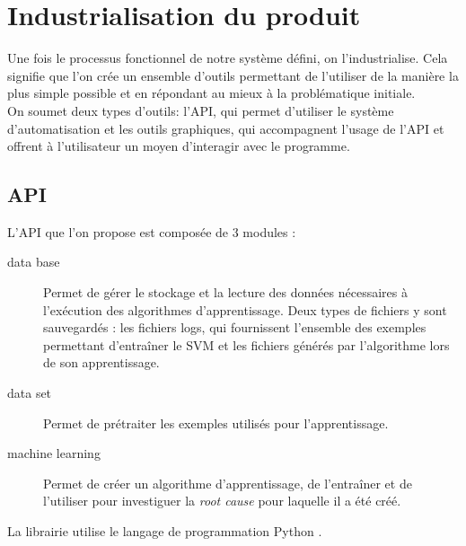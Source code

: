 \chapter{Industrialisation du produit}
\label{Industrialisation du produit}
\thispagestyle{fancy}
Une fois le processus fonctionnel de notre système défini, on l'industrialise. Cela signifie que l'on crée un ensemble d'outils permettant de l'utiliser de la manière la plus simple possible et en répondant au mieux à la problématique initiale. \\
On soumet deux types d'outils: l'API, qui permet d'utiliser le système d'automatisation et les outils graphiques, qui accompagnent l'usage de l'API et offrent à l'utilisateur un moyen d'interagir avec le programme.  

\section{API}
\label{Industrialisation du produit: API}
L'API que l'on propose est composée de 3 modules :
\begin{description}
	\item [data base] Permet de gérer le stockage et la lecture des données nécessaires à l'exécution des algorithmes d'apprentissage. Deux types de fichiers y sont sauvegardés : les fichiers logs, qui fournissent l'ensemble des exemples permettant d'entraîner le SVM et les fichiers générés par l'algorithme lors de son apprentissage.
	\item [data set] Permet de prétraiter les exemples utilisés pour l'apprentissage.
	\item [machine learning] Permet de créer un algorithme d'apprentissage, de l'entraîner et de l'utiliser pour investiguer la \emph{root cause} pour laquelle il a été créé.
\end{description}

La librairie utilise le langage de programmation Python \cite{Python}. \\

